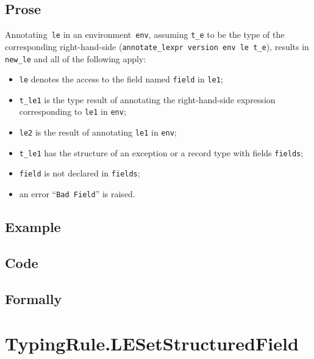 \documentclass{book}
\begin{document}
  \subsection{Prose}
   Annotating~\texttt{le} in an environment~\texttt{env}, assuming
\texttt{t\_e} to be the type of the corresponding right-hand-side
(\texttt{annotate\_lexpr version env le t\_e}), results in \texttt{new\_le} and
all of the following apply:
   \begin{itemize}
   \item \texttt{le} denotes the access to the field named \texttt{field} in \texttt{le1};
   \item \texttt{t\_le1} is the type result of annotating the right-hand-side expression corresponding to \texttt{le1} in \texttt{env};
   \item \texttt{le2} is the result of annotating \texttt{le1} in \texttt{env};
   \item \texttt{t\_le1} has the structure of an exception or a record type with fields \texttt{fields};
   \item \texttt{field} is not declared in \texttt{fields};
   \item an error ``\texttt{Bad Field}'' is raised.
   \end{itemize}

  \subsection{Example}

  \subsection{Code}

\begin{emptyformal}
    \subsection{Formally}
\end{emptyformal}


\section{TypingRule.LESetStructuredField \label{sec:TypingRule.LESetStructuredField}}
\end{document}
